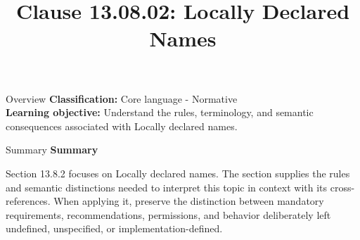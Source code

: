 \documentclass[10pt,letterpaper]{article}
\title{Clause 13.08.02: Locally Declared Names}
\author{}
\date{}
\begin{document}
\maketitle
\begin{CornellOverviewBox}{Overview}
\textbf{Classification:} Core language - Normative\\[2pt]
\textbf{Learning objective:} Understand the rules, terminology, and semantic consequences associated with Locally declared names.
\end{CornellOverviewBox}\begin{CornellSummaryBox}{Summary}
{\sffamily\bfseries\color{Accent} Summary}\par\vspace{3pt}Section 13.8.2 focuses on Locally declared names. The section supplies the rules and semantic distinctions needed to interpret this topic in context with its cross-references. When applying it, preserve the distinction between mandatory requirements, recommendations, permissions, and behavior deliberately left undefined, unspecified, or implementation-defined.
\end{CornellSummaryBox}
\end{document}
